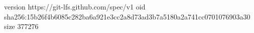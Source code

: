 version https://git-lfs.github.com/spec/v1
oid sha256:15b26f4b6085c282ba6a921e3cc2a8d73ad3b7a5180a2a741cc0701076903a30
size 377276
